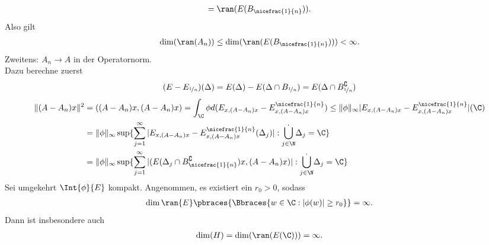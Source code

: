 \begin{solution}
\begin{align*}
  = \ran(E(B_{\nicefrac{1}{n}})).
\end{align*}
Also gilt
\begin{align*}
  \dim(\ran(A_n)) \leq \dim(\ran(E(B_{\nicefrac{1}{n}}))) < \infty.
\end{align*}
Zweitens: $A_n \to A$ in der Operatornorm. \\
Dazu berechne zuerst
\begin{align*}
  (E - E_{\nicefrac{1}{n}})(\Delta) = E(\Delta) - E(\Delta \cap B_{\nicefrac{1}{n}}) = E(\Delta\cap B_{\nicefrac{1}{n}}^{\complement})
\end{align*}
\begin{align*}
  \|(A - A_n)x\|^2 &= ((A-A_n)x,(A-A_n)x) = \int_{\C}\phi d(E_{x,(A-A_n)x} - E^{\nicefrac{1}{n}}_{x,(A-A_n)x})
  \leq \|\phi\|_{\infty}|E_{x,(A-A_n)x} - E^{\nicefrac{1}{n}}_{x,(A-A_n)x}|(\C) \\
  &= \|\phi\|_{\infty}\sup\{\sum_{j=1}^{\infty}|E_{x,(A-A_n)x} - E^{\nicefrac{1}{n}}_{x,(A-A_n)x}(\Delta_j)|: \dot{\bigcup_{j \in \N}}\Delta_j = \C\} \\
  &=  \|\phi\|_{\infty}\sup\{\sum_{j=1}^{\infty}|(E(\Delta_j\cap B_{\nicefrac{1}{n}}^{\complement})x, (A-A_n)x)|: \dot{\bigcup_{j \in \N}}\Delta_j = \C\}
\end{align*}
Sei umgekehrt $\Int{\phi}{E}$ kompakt. Angenommen, es existiert ein $r_0 > 0$,
sodass
\begin{align*}
  \dim{\ran{E}}\pbraces{\Bbraces{w \in \C:|\phi(w)| \geq r_0}} = \infty.
\end{align*}
Dann ist insbesondere auch
\begin{align*}
  \dim(H) = \dim(\ran(E(\C))) = \infty.
\end{align*}
\end{solution}
